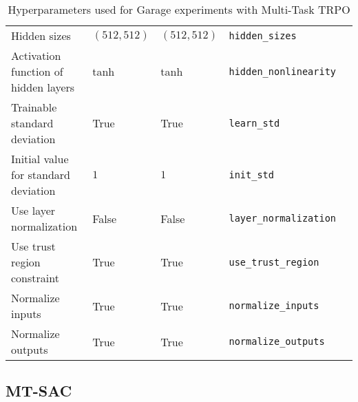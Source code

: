 \begin{table}[h!]
\begin{tabularx}{\linewidth}{ L{2in} X X X l }
    \midrule
    Hidden sizes & $(512, 512)$ & $(512, 512)$ & \texttt{hidden\_sizes} \\
    Activation function of hidden layers & tanh & tanh & \texttt{hidden\_nonlinearity} \\
    Trainable standard deviation & True & True & \texttt{learn\_std} \\
    Initial value for standard deviation & $1$ & $1$ & \texttt{init\_std} \\
    Use layer normalization & False & False & \texttt{layer\_normalization} \\
    Use trust region constraint & True & True & \texttt{use\_trust\_region} \\
    Normalize inputs & True & True & \texttt{normalize\_inputs} \\
    Normalize outputs & True & True & \texttt{normalize\_outputs} \\
    \bottomrule
\end{tabularx}
\caption{Hyperparameters used for Garage experiments with Multi-Task TRPO}
\label{tab:garage_trpo_hparams}
\end{table}

\FloatBarrier


\clearpage
\subsection{MT-SAC}

\FloatBarrier

